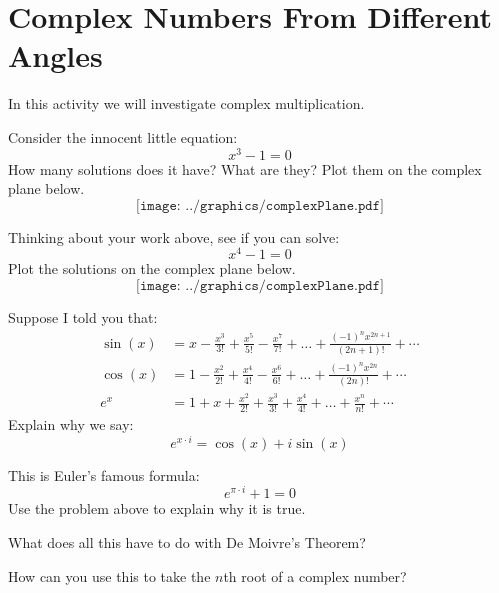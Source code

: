 \newpage
\section{Complex Numbers From Different Angles}


In this activity we will investigate complex multiplication.

\begin{prob} Consider the innocent little equation:
\[
x^3 -1 = 0
\]
How many solutions does it have? What are they? Plot them on the
complex plane below.
\[
\texttt{[image: ../graphics/complexPlane.pdf]}
\]
\end{prob}

\begin{prob}
Thinking about your work above, see if you can solve:
\[
x^4 -1 = 0
\]
Plot the solutions on the complex plane below.
\[
\texttt{[image: ../graphics/complexPlane.pdf]}
\]
\end{prob}


\begin{prob}
Suppose I told you that:
\begin{align*}
\sin(x) &= x - \frac{x^3}{3!} + \frac{x^5}{5!} - \frac{x^7}{7!} + \dots + \frac{(-1)^n x^{2n+1}}{(2n+1)!} + \cdots \\
\cos(x) &= 1 - \frac{x^2}{2!} + \frac{x^4}{4!} - \frac{x^6}{6!} + \dots + \frac{(-1)^n x^{2n}}{(2n)!} + \cdots \\
e^x &= 1 + x + \frac{x^2}{2!} + \frac{x^3}{3!} + \frac{x^4}{4!} + \dots + \frac{x^n}{n!} + \cdots 
\end{align*}
Explain why we say:
\[
e^{x\cdot i} = \cos(x) + i \sin(x)
\]
\end{prob}

\begin{prob}
 This is Euler's famous formula:
\[
e^{\pi \cdot i } + 1 = 0
\]
Use the problem above to explain why it is true.
\end{prob}

\begin{prob}
What does all this have to do with De Moivre's Theorem?
\end{prob}

\begin{prob}
How can you use this to take the $n$th root of a complex number?
\end{prob}
